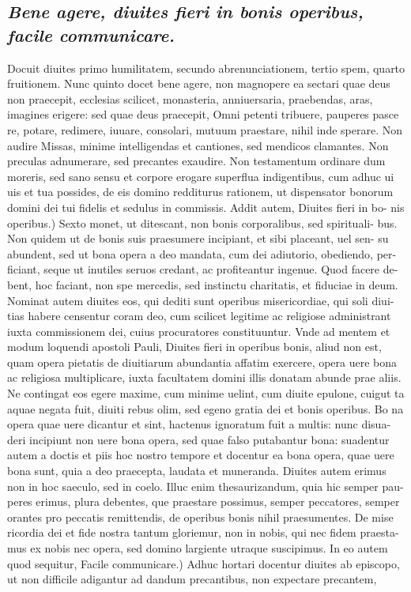 \documentclass{article}
\begin{document}
\begin{pages}
\subsection*{\textit{Bene agere, diuites fieri in bonis operibus, facile communicare. }}\pstart Docuit diuites primo humilitatem, secundo abrenunciationem, tertio spem, quarto fruitionem. Nunc quinto docet bene agere, non magnopere ea sectari quae deus non praecepit, ecclesias scilicet, monasteria, anniuersaria, praebendas, aras, imagines erigere: sed quae deus praecepit, Omni petenti tribuere, pauperes pasce re, potare, redimere, iuuare, consolari, mutuum praestare, nihil inde sperare. Non audire Missas, minime intelligendas et cantiones, sed mendicos clamantes. Non preculas adnumerare, sed precantes exaudire. Non testamentum ordinare dum moreris, sed sano sensu et corpore erogare superflua indigentibus, cum adhuc ui uis et tua possides, de eis domino redditurus rationem, ut dispensator bonorum domini dei tui fidelis et sedulus in commissis. Addit autem, Diuites fieri in bo- nis operibus.) Sexto monet, ut ditescant, non bonis corporalibus, sed spirituali- bus. Non quidem ut de bonis suis praesumere incipiant, et sibi placeant, uel sen- su abundent, sed ut bona opera a deo mandata, cum dei adiutorio, obediendo, per- ficiant, seque ut inutiles seruos credant, ac profiteantur ingenue. Quod facere de- bent, hoc faciant, non spe mercedis, sed instinctu charitatis, et fiduciae in deum. Nominat autem diuites eos, qui dediti sunt operibus misericordiae, qui soli diui- tias habere censentur coram deo, cum scilicet legitime ac religiose administrant iuxta commissionem dei, cuius procuratores constituuntur. Vnde ad mentem et modum loquendi apostoli Pauli, Diuites fieri in operibus bonis, aliud non est, quam opera pietatis de diuitiarum abundantia affatim exercere, opera uere bona ac religiosa multiplicare, iuxta facultatem domini illis donatam abunde prae aliis. Ne contingat eos egere maxime, cum minime uelint, cum diuite epulone, cuigut ta aquae negata fuit, diuiti rebus olim, sed egeno gratia dei et bonis operibus. Bo na opera quae uere dicantur et sint, hactenus ignoratum fuit a multis: nunc disua- deri incipiunt non uere bona opera, sed quae falso putabantur bona: suadentur autem a doctis et piis hoc nostro tempore et docentur ea bona opera, quae uere bona sunt, quia a deo praecepta, laudata et muneranda. Diuites autem erimus non in hoc saeculo, sed in coelo. Illuc enim thesaurizandum, quia hic semper pau- peres erimus, plura debentes, que praestare possimus, semper peccatores, semper orantes pro peccatis remittendis, de operibus bonis nihil praesumentes. De mise ricordia dei et fide nostra tantum gloriemur, non in nobis, qui nec fidem praesta- mus ex nobis nec opera, sed domino largiente utraque suscipimus. In eo autem quod sequitur, Facile communicare.) Adhuc hortari docentur diuites ab episcopo, ut non difficile adigantur ad dandum precantibus, non expectare precantem,  \pend

\end{pages}
\end{document}
